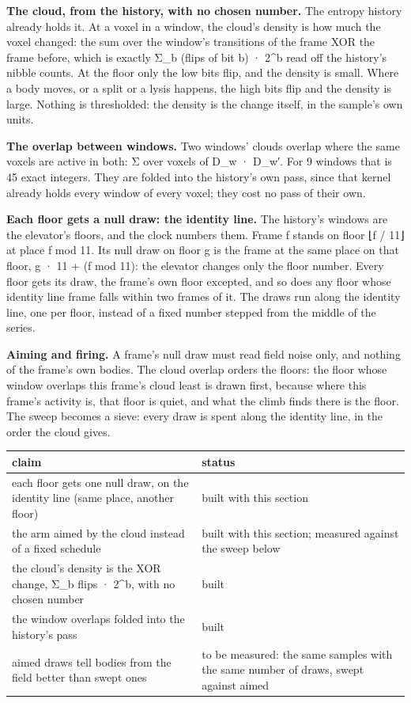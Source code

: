 \textbf{The cloud, from the history, with no chosen number.} The entropy history already holds it. At a voxel in a window, the cloud's density is how much the voxel changed: the sum over the window's transitions of the frame XOR the frame before, which is exactly Σ\_\allowbreak{}b (flips of bit b) · 2\textasciicircum{}b read off the history's nibble counts. At the floor only the low bits flip, and the density is small. Where a body moves, or a split or a lysis happens, the high bits flip and the density is large. Nothing is thresholded: the density is the change itself, in the sample's own units.

\textbf{The overlap between windows.} Two windows' clouds overlap where the same voxels are active in both: Σ over voxels of D\_\allowbreak{}w · D\_\allowbreak{}w′. For 9 windows that is 45 exact integers. They are folded into the history's own pass, since that kernel already holds every window of every voxel; they cost no pass of their own.

\textbf{Each floor gets a null draw: the identity line.} The history's windows are the elevator's floors, and the clock numbers them. Frame f stands on floor ⌊f / 11⌋ at place f mod 11. Its null draw on floor g is the frame at the same place on that floor, g · 11 + (f mod 11): the elevator changes only the floor number. Every floor gets its draw, the frame's own floor excepted, and so does any floor whose identity line frame falls within two frames of it. The draws run along the identity line, one per floor, instead of a fixed number stepped from the middle of the series.

\textbf{Aiming and firing.} A frame's null draw must read field noise only, and nothing of the frame's own bodies. The cloud overlap orders the floors: the floor whose window overlaps this frame's cloud least is drawn first, because where this frame's activity is, that floor is quiet, and what the climb finds there is the floor. The sweep becomes a sieve: every draw is spent along the identity line, in the order the cloud gives.

{\small
\setlength{\tabcolsep}{6pt}
\begin{longtable}{>{\RaggedRight\arraybackslash}p{}>{\RaggedRight\arraybackslash}p{}}
\toprule
claim & status \\
\midrule
\endhead
each floor gets one null draw, on the identity line (same place, another floor) & built with this section \\
the arm aimed by the cloud instead of a fixed schedule & built with this section; measured against the sweep below \\
the cloud's density is the XOR change, Σ\_\allowbreak{}b flips · 2\textasciicircum{}b, with no chosen number & built \\
the window overlaps folded into the history's pass & built \\
aimed draws tell bodies from the field better than swept ones & to be measured: the same samples with the same number of draws, swept against aimed \\
\bottomrule
\end{longtable}
}

